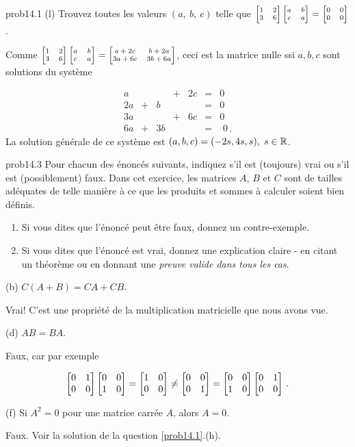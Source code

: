 \begin{sol}{prob14.1}
(l) Trouvez toutes les valeurs $ (a,\ b,\ c)$ telle que $\scriptsize\bmatrix 1&
2\\ 3&6\endbmatrix \bmatrix a&b\\ c&a\endbmatrix=\bmatrix0&0\cr 0&0\endbmatrix
 $.
\medskip


\soln Comme  $\scriptsize\bmatrix 1&
2\\ 3&6\endbmatrix \bmatrix a&b\\ c&a\endbmatrix= \bmatrix a+2c&
b+2a\\ 3a+6c&3b+6a\endbmatrix$, ceci est la matrice nulle ssi $a,b,c$ sont solutions du système

$$\begin{matrix}  
a& & &+&2c&=&0\\
2a & +&b& &    &=&0\\
3a& & &+&6c&=&0\\ 
6a & +&3b& &    &=&\,\,0\,. \end{matrix} $$ 
La solution g\'en\'erale de ce syst\`eme est $(a,b,c)=(-2s, 4s, s), \; s\in \mathbb{R}$.
\end{sol}


\bigskip
\begin{sol}{prob14.3} Pour chacun des énoncés suivants, indiquez s'il est (toujours) vrai
ou s'il est (possiblement) faux.     Dans cet exercice, les matrices $A$, $B$ et $C$ sont de tailles adéquates de telle manière à ce que les produits et sommes à calculer soient bien définis.
   \smallskip    
\begin{enumerate}[$\bullet$]
\item Si vous dites que l'\'enonc\'e peut être faux, donnez un contre-exemple.   
\item Si vous dites que l'\'enonc\'e est vrai, donnez une explication claire - en citant un théorème ou en donnant une {\it preuve valide dans tous les cas}. 
\end{enumerate}
\medskip

(b) $C(A+B)=CA+CB$.

\soln Vrai! C'est une propriété de la multiplication matricielle que nous avons vue.
\medskip
 

(d) $AB=BA$.

\soln Faux, car par exemple

$$\bmatrix 0&1\\ 0&0\endbmatrix\bmatrix 0&0\\ 1&0\endbmatrix=\bmatrix 1&0\\ 0&0\endbmatrix\not=\bmatrix 0&0\\ 0&1\endbmatrix=\bmatrix 0&0\\ 1&0\endbmatrix\bmatrix 0&1\\ 0&0\endbmatrix\,.$$
\medskip
 

(f)   Si $A^2=0$ pour une matrice carr\'ee $A$, alors $A=0$.

\soln Faux. Voir la solution de la question \ref{prob14.1}.(h).
\medskip

 
\end{sol}


